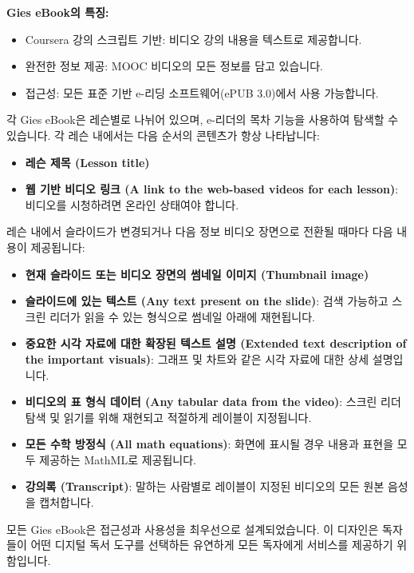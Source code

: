 \documentclass[11pt,a4paper]{book}
\theoremstyle{definition}
\begin{document}
\begin{summarybox}
\textbf{Gies eBook의 특징:}
\begin{itemize}
    \item Coursera 강의 스크립트 기반: 비디오 강의 내용을 텍스트로 제공합니다.
    \item 완전한 정보 제공: MOOC 비디오의 모든 정보를 담고 있습니다.
    \item 접근성: 모든 표준 기반 e-리딩 소프트웨어(ePUB 3.0)에서 사용 가능합니다.
\end{itemize}
\end{summarybox}

각 Gies eBook은 레슨별로 나뉘어 있으며, e-리더의 목차 기능을 사용하여 탐색할 수 있습니다. 각 레슨 내에서는 다음 순서의 콘텐츠가 항상 나타납니다:

\begin{itemize}
    \item \textbf{레슨 제목 (Lesson title)}
    \item \textbf{웹 기반 비디오 링크 (A link to the web-based videos for each lesson)}: 비디오를 시청하려면 온라인 상태여야 합니다.
\end{itemize}

레슨 내에서 슬라이드가 변경되거나 다음 정보 비디오 장면으로 전환될 때마다 다음 내용이 제공됩니다:

\begin{itemize}
    \item \textbf{현재 슬라이드 또는 비디오 장면의 썸네일 이미지 (Thumbnail image)}
    \item \textbf{슬라이드에 있는 텍스트 (Any text present on the slide)}: 검색 가능하고 스크린 리더가 읽을 수 있는 형식으로 썸네일 아래에 재현됩니다.
    \item \textbf{중요한 시각 자료에 대한 확장된 텍스트 설명 (Extended text description of the important visuals)}: 그래프 및 차트와 같은 시각 자료에 대한 상세 설명입니다.
    \item \textbf{비디오의 표 형식 데이터 (Any tabular data from the video)}: 스크린 리더 탐색 및 읽기를 위해 재현되고 적절하게 레이블이 지정됩니다.
    \item \textbf{모든 수학 방정식 (All math equations)}: 화면에 표시될 경우 내용과 표현을 모두 제공하는 MathML로 제공됩니다.
    \item \textbf{강의록 (Transcript)}: 말하는 사람별로 레이블이 지정된 비디오의 모든 원본 음성을 캡처합니다.
\end{itemize}

모든 Gies eBook은 접근성과 사용성을 최우선으로 설계되었습니다. 이 디자인은 독자들이 어떤 디지털 독서 도구를 선택하든 유연하게 모든 독자에게 서비스를 제공하기 위함입니다.
\end{document}

